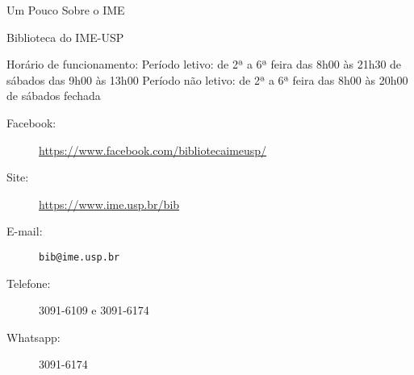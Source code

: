 \begin{secao}{Um Pouco Sobre o IME}
\begin{subsecao}{Biblioteca do IME-USP}
\begin{subsubsecao}{Horário de funcionamento:}
Período letivo: de 2ª a 6ª feira das 8h00 às 21h30 \newline
\phantom{Período letivo: }de sábados das 9h00 às 13h00 \newline
Período não letivo: de 2ª a 6ª feira das 8h00 às 20h00 \newline
\phantom{Período não letivo: }de sábados fechada 
\end{subsubsecao}
\begin{description}
  \item[Facebook:] \url{https://www.facebook.com/bibliotecaimeusp/}
  \item[Site:] \url{https://www.ime.usp.br/bib}
  \item[E-mail:] \texttt{bib@ime.usp.br}
  \item[Telefone:] 3091-6109 e 3091-6174
  \item[Whatsapp:] 3091-6174
\end{description}

\end{subsecao}
\end{secao}
